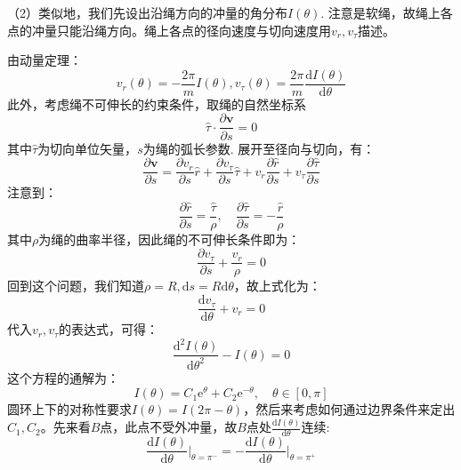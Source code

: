\documentclass{ctexart}
\begin{document}
\noindent（2）类似地，我们先设出沿绳方向的冲量的角分布$I(\theta)$. 注意是软绳，故绳上各点的冲量只能沿绳方向。绳上各点的径向速度与切向速度用$v_r,v_\tau$描述。

由动量定理：
\begin{equation}
v_r(\theta)=-\frac{2\pi}{m}I(\theta),v_\tau(\theta)=\frac{2\pi}{m}\frac{\mathrm{d}I(\theta)}{\mathrm{d}\theta} \tag{4.7}
\end{equation}
此外，考虑绳不可伸长的约束条件，取绳的自然坐标系
\begin{equation}
\hat{\tau}\cdot\frac{\partial\bm{v}}{\partial{s}}=0 \tag{4.8}
\end{equation}
其中$\hat{\tau}$为切向单位矢量，$s$为绳的弧长参数. 展开至径向与切向，有：
\begin{equation}
  \frac{\partial\bm{v}}{\partial{s}}=\frac{\partial v_r}{\partial s}\hat{r}+\frac{\partial v_\tau}{\partial s}\hat{\tau}+v_r\frac{\partial \hat{r}}{\partial s}+v_{\tau}\frac{\partial \hat{\tau}}{\partial s} \tag{4.9}
\end{equation}
注意到：
\begin{equation}
  \frac{\partial \hat{r}}{\partial s}=\frac{\hat{\tau}}{\rho},\quad \frac{\partial \hat{\tau}}{\partial s}=-\frac{\hat{r}}{\rho} \tag{4.10}
\end{equation}
其中$\rho$为绳的曲率半径，因此绳的不可伸长条件即为：
\begin{equation}
  \frac{\partial v_{\tau}}{\partial s}+\frac{v_r}{\rho}=0 \tag{4.11}
\end{equation}
回到这个问题，我们知道$\rho=R,\mathrm{d}s=R\mathrm{d}\theta$，故上式化为：
\begin{equation}
  \frac{\mathrm{d} v_\tau}{\mathrm{d} \theta}+{v_r}=0 \tag{4.12}
\end{equation}
代入$v_r,v_\tau$的表达式，可得：
\begin{equation}
  \frac{\mathrm{d}^2 I(\theta)}{\mathrm{d} \theta^2}-{I(\theta)}=0 \tag{4.13}
\end{equation}
这个方程的通解为：
\begin{equation}
  I(\theta)=C_1\mathrm{e}^{\theta}+C_2\mathrm{e}^{-\theta},\quad \theta\in[0,\pi] \tag{4.14}
\end{equation}
圆环上下的对称性要求$I(\theta)=I(2\pi-\theta)$，然后来考虑如何通过边界条件来定出$C_1,C_2$。先来看$B$点，此点不受外冲量，故$B$点处$\frac{\mathrm{d} I(\theta)}{\mathrm{d} \theta}$连续:
\begin{equation}
  \frac{\mathrm{d} I(\theta)}{\mathrm{d} \theta}\Big|_{\theta=\pi^-}=-\frac{\mathrm{d} I(\theta)}{\mathrm{d} \theta}\Big|_{\theta=\pi^+} \tag{4.15}
\end{equation}
\end{document}
